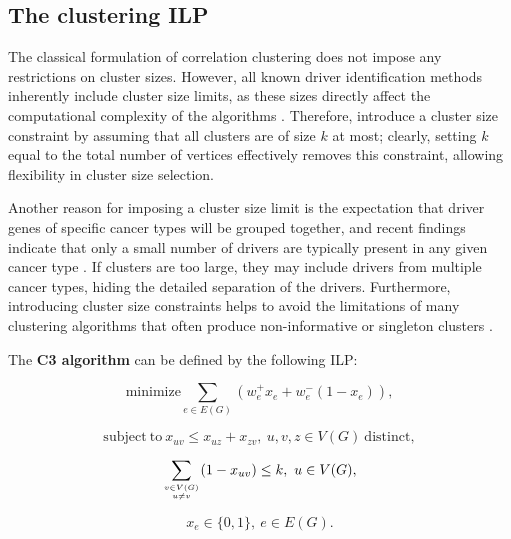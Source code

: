 \subsection{The clustering ILP}

The classical formulation of correlation clustering does not impose any restrictions on cluster sizes. However, all known driver identification methods inherently include cluster size limits, as these sizes directly affect the computational complexity of the algorithms . Therefore, \textcite{c3} introduce a cluster size constraint by assuming that all clusters are of size $k$ at most; clearly, setting $k$ equal to the total number of vertices effectively removes this constraint, allowing flexibility in cluster size selection.

Another reason for imposing a cluster size limit is the expectation that driver genes of specific cancer types will be grouped together, and recent findings indicate that only a small number of drivers are typically present in any given cancer type . If clusters are too large, they may include drivers from multiple cancer types, hiding the detailed separation of the drivers. Furthermore, introducing cluster size constraints helps to avoid the limitations of many clustering algorithms that often produce non-informative  or singleton clusters .

\begin{definition}[C3's ILP] \label{c3_ilp}
    The \textbf{C3 algorithm} can be defined by the following ILP:

    \begin{equation} \label{c3_first}
        \mathrm{minimize} \sum_{e \in E(G)} (w_e^+x_e + w_e^-(1 - x_e)),
    \end{equation}

    \begin{equation} \label{c3_second}
        \mathrm{subject \ to \ } x_{uv} \le x_{uz} + x_{zv}, \ u, v, z \in V(G) \mathrm{\ distinct},
    \end{equation}

    \begin{equation} \label{c3_third}
        \sum_{v \in V(G) \atop u \neq v} (1 - x_{uv}) \le k, \ u \in V(G),
    \end{equation}

    \begin{equation} \label{c3_fourth}
        x_e \in \{0, 1\}, \ e \in E(G).
    \end{equation}
\end{definition}

